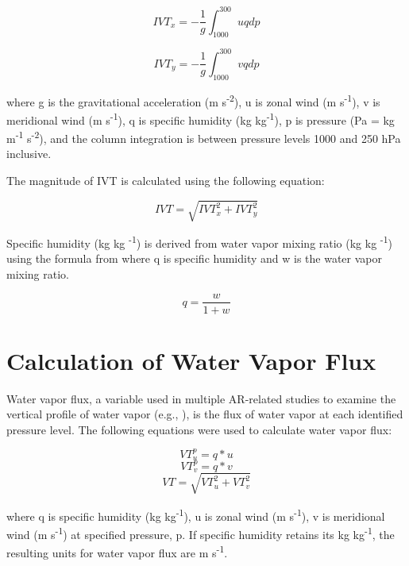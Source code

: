 \documentclass[draft]{agujournal2019}
\begin{document}
\begin{equation}
IVT_{x} = -\frac{1}{g} \int_{1000}^{300} u q dp
\end{equation}

\begin{equation}
IVT_{y} = -\frac{1}{g} \int_{1000}^{300} v q dp
\end{equation}

where g is the gravitational acceleration (m s\textsuperscript{-2}), u is zonal wind (m s\textsuperscript{-1}), v is meridional wind (m s\textsuperscript{-1}), q is specific humidity (kg kg\textsuperscript{-1}), p is pressure (Pa = kg m\textsuperscript{-1} s\textsuperscript{-2}), and the column integration is between pressure levels 1000 and 250 hPa inclusive.

The magnitude of IVT is calculated using the following equation:

\begin{equation}
IVT = \sqrt{IVT_{x}^2 + IVT_{y}^2}
\end{equation}

Specific humidity (kg kg \textsuperscript{-1}) is derived from water vapor mixing ratio (kg kg \textsuperscript{-1}) using the formula from \cite{Wallace2006} where q is specific humidity and w is the water vapor mixing ratio.

\begin{equation}
q = \frac{w}{1 + w}
\end{equation}

\section{Calculation of Water Vapor Flux}    %
\label{appendix:wvf}
Water vapor flux, a variable used in multiple AR-related studies to examine the vertical profile of water vapor (e.g., ), is the flux of water vapor at each identified pressure level. The following equations were used to calculate water vapor flux: 

\begin{equation}
VT_{u}^{p}   = q*u 
\end{equation}
\begin{equation}
VT_{v}^{p}   = q*v   
\end{equation}
\begin{equation}
VT = \sqrt{VT^{2}_{u} + VT^{2}_{v}}
\end{equation}

where q is specific humidity (kg kg\textsuperscript{-1}), u is zonal wind (m s\textsuperscript{-1}), v is meridional wind (m s\textsuperscript{-1}) at specified pressure, p. If specific humidity retains its kg kg\textsuperscript{-1}, the resulting units for water vapor flux are m s\textsuperscript{-1}. 
\end{document}
